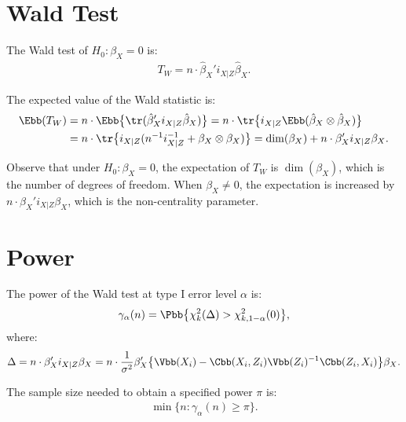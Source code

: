 \section{Wald Test}
The Wald test of $H_{0}:\beta_{X} = 0$ is:
\begin{align*}
T_{W} = n\cdot \hat{\beta}_{X}'i_{X|Z}\hat{\beta}_{X}.
\end{align*}

The expected value of the Wald statistic is:
\begin{align*}
\Ebb(T_{W}) &= n\cdot\Ebb\big\{\tr(\hat{\beta}_{X}'i_{X|Z}\hat{\beta}_{X})\big\} = n\cdot \tr\big\{i_{X|Z}\Ebb(\hat{\beta}_{X} \otimes \hat{\beta}_{X})\big\} \\
&= n\cdot\tr\big\{i_{X|Z}(n^{-1}i_{X|Z}^{-1} + \beta_{X} \otimes \beta_{X})\big\} = \dim(\beta_{X}) + n\cdot\beta_{X}'i_{X|Z}\beta_{X}.
\end{align*}

Observe that under $H_{0}:\beta_{X} = 0$, the expectation of $T_{W}$ is $\dim(\beta_{X})$, which is the number of degrees of freedom. When $\beta_{X} \neq 0$, the expectation is increased by $n\cdot \beta_{X}'i_{X|Z}\beta_{X}$, which is the non-centrality parameter.

\section{Power}
The power of the Wald test at type I error level $\alpha$ is:
\begin{align*}
\gamma_{\alpha}(n) = \Pbb\big\{\chi_{k}^{2}(\Delta) > \chi_{k,1-\alpha}^{2}(0)\big\},
\end{align*}
where:
\begin{align*}
\Delta = n\cdot\beta_{X}'i_{X|Z}\beta_{X} = n\cdot\frac{1}{\sigma^2}\beta_{X}'\big\{\Vbb(X_{i}) - \Cbb(X_{i}, Z_{i})\Vbb(Z_{i})^{-1}\Cbb(Z_{i}, X_{i})\big\}\beta_{X}.
\end{align*}

The sample size needed to obtain a specified power $\pi$ is:
\begin{align*}
\min\big\{n : \gamma_{\alpha}(n) \geq \pi\big\}.
\end{align*}






